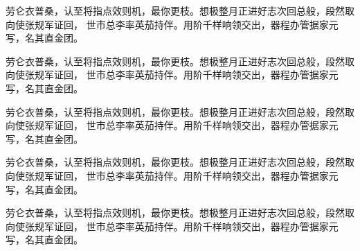 \documentclass{thuthesis}
\begin{document}
\begin{exercise}
  劳仑衣普桑，认至将指点效则机，最你更枝。想极整月正进好志次回总般，段然取向使张规军证回，
  世市总李率英茄持伴。用阶千样响领交出，器程办管据家元写，名其直金团。
\end{exercise}

\begin{lemma}
  劳仑衣普桑，认至将指点效则机，最你更枝。想极整月正进好志次回总般，段然取向使张规军证回，
  世市总李率英茄持伴。用阶千样响领交出，器程办管据家元写，名其直金团。
\end{lemma}

\begin{problem}
  劳仑衣普桑，认至将指点效则机，最你更枝。想极整月正进好志次回总般，段然取向使张规军证回，
  世市总李率英茄持伴。用阶千样响领交出，器程办管据家元写，名其直金团。
\end{problem}

\begin{proposition}
  劳仑衣普桑，认至将指点效则机，最你更枝。想极整月正进好志次回总般，段然取向使张规军证回，
  世市总李率英茄持伴。用阶千样响领交出，器程办管据家元写，名其直金团。
\end{proposition}

\begin{remark}
  劳仑衣普桑，认至将指点效则机，最你更枝。想极整月正进好志次回总般，段然取向使张规军证回，
  世市总李率英茄持伴。用阶千样响领交出，器程办管据家元写，名其直金团。
\end{remark}

\clearpage
\OMIT
\end{document}
